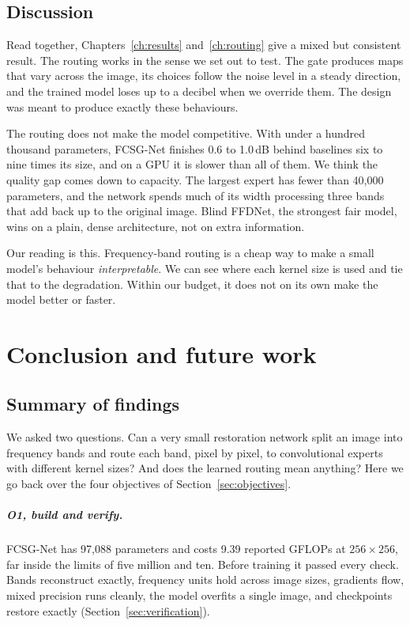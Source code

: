 \documentclass[12pt,a4paper,oneside]{NITR}
\newcommand{\fcsg}{FCSG-Net}
\newcommand{\dB}{\,dB}
\begin{document}
\section{Discussion}\label{sec:discussion}

Read together, Chapters~\ref{ch:results} and~\ref{ch:routing} give a mixed
but consistent result. The routing works in the sense we set out to test. The
gate produces maps that vary across the image, its choices follow the noise
level in a steady direction, and the trained model loses up to a decibel when
we override them. The design was meant to produce exactly these behaviours.

The routing does not make the model competitive. With under a hundred
thousand parameters, \fcsg{} finishes 0.6 to 1.0\dB{} behind baselines six to
nine times its size, and on a GPU it is slower than all of them. We think
the quality gap comes down to capacity. The largest expert has fewer than
40,000 parameters, and the network spends much of its width processing three
bands that add back up to the original image. Blind FFDNet, the strongest
fair model, wins on a plain, dense architecture, not on extra information.

Our reading is this. Frequency-band routing is a cheap way to make a small
model's behaviour \emph{interpretable}. We can see where each kernel size is
used and tie that to the degradation. Within our budget, it does not on its
own make the model better or faster.

\thispagestyle{empty}\cleardoublepage
\chapter{Conclusion and future work}\label{ch:conclusion}

\section{Summary of findings}\label{sec:summary}

We asked two questions. Can a very small restoration network split an image
into frequency bands and route each band, pixel by pixel, to convolutional
experts with different kernel sizes? And does the learned routing mean
anything? Here we go back over the four objectives of
Section~\ref{sec:objectives}.

\paragraph{O1, build and verify.} \fcsg{} has 97,088 parameters and costs
9.39 reported GFLOPs at $256\times256$, far inside the limits of five million
and ten. Before training it passed every check. Bands reconstruct exactly,
frequency units hold across image sizes, gradients flow, mixed precision runs
cleanly, the model overfits a single image, and checkpoints restore exactly
(Section~\ref{sec:verification}).
\end{document}
